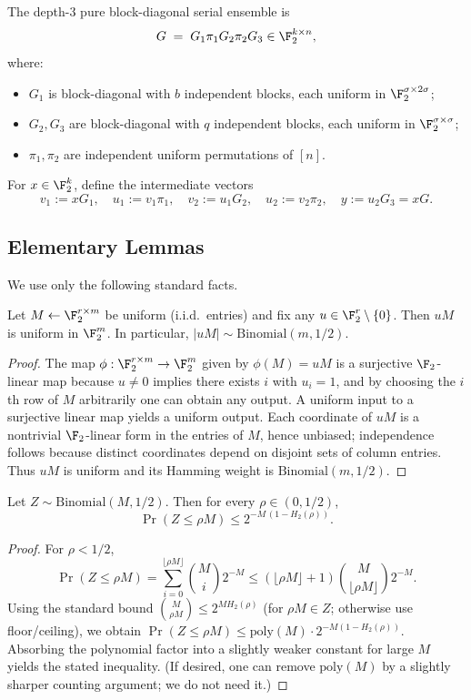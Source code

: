 The depth-$3$ pure block-diagonal serial ensemble is
\[
G \;=\; G_1 \pi_1 G_2 \pi_2 G_3 \in \F_2^{k\times n},
\]
where:
\begin{itemize}
\item $G_1$ is block-diagonal with $b$ independent blocks, each uniform in $\F_2^{\sigma\times 2\sigma}$;
\item $G_2,G_3$ are block-diagonal with $q$ independent blocks, each uniform in $\F_2^{\sigma\times\sigma}$;
\item $\pi_1,\pi_2$ are independent uniform permutations of $[n]$.
\end{itemize}
For $x\in\F_2^k$, define the intermediate vectors
\[
v_1 := xG_1,\quad u_1 := v_1\pi_1,\quad v_2 := u_1G_2,\quad u_2 := v_2\pi_2,\quad y := u_2G_3=xG.
\]











\subsection{Elementary Lemmas}
We use only the following standard facts.

\begin{lemma}\label{lem:bd-uniform-formal}
Let $M\leftarrow \F_2^{r\times m}$ be uniform (i.i.d.\ entries) and fix any $u\in\F_2^r\setminus\{0\}$.
Then $uM$ is uniform in $\F_2^m$. In particular, $|uM|\sim \mathrm{Binomial}(m,1/2)$.
\end{lemma}
\begin{proof}
The map $\phi:\F_2^{r\times m}\to\F_2^m$ given by $\phi(M)=uM$ is a surjective $\F_2$-linear map
because $u\neq 0$ implies there exists $i$ with $u_i=1$, and by choosing the $i$th row of $M$ arbitrarily one can obtain any output.
A uniform input to a surjective linear map yields a uniform output. Each coordinate of $uM$ is a nontrivial $\F_2$-linear form
in the entries of $M$, hence unbiased; independence follows because distinct coordinates depend on disjoint sets of column entries.
Thus $uM$ is uniform and its Hamming weight is $\mathrm{Binomial}(m,1/2)$.
\end{proof}

\begin{lemma}\label{lem:bd-bintail}
Let $Z\sim \mathrm{Binomial}(M,1/2)$.
Then for every $\rho\in(0,1/2)$,
\[
\Pr(Z\le \rho M)\le 2^{-M\,(1-H_2(\rho))}.
\]
\end{lemma}
\begin{proof}
For $\rho<1/2$,
\[
\Pr(Z\le \rho M)
=\sum_{i=0}^{\lfloor\rho M\rfloor}\binom{M}{i}2^{-M}
\le (\lfloor\rho M\rfloor+1)\binom{M}{\lfloor\rho M\rfloor}2^{-M}.
\]
Using the standard bound $\binom{M}{\rho M}\le 2^{M H_2(\rho)}$ (for $\rho M\in Z$; otherwise use floor\slash ceiling),
we obtain $\Pr(Z\le \rho M)\le \mathrm{poly}(M)\cdot 2^{-M(1-H_2(\rho))}$.
Absorbing the polynomial factor into a slightly weaker constant for large $M$ yields the stated inequality.
(If desired, one can remove $\mathrm{poly}(M)$ by a slightly sharper counting argument; we do not need it.)
\end{proof}

